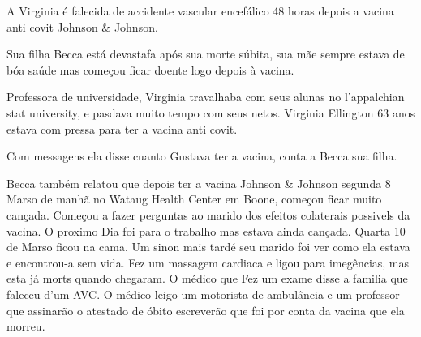 A Virginia é falecida de accidente vascular encefálico 48 horas depois a vacina
anti covit Johnson \& Johnson.

Sua filha Becca está devastafa após sua morte súbita, sua mãe sempre estava de
bóa saúde mas começou ficar doente logo depois à vacina.

Professora de universidade, Virginia travalhaba com seus alunas no l'appalchian
stat university, e pasdava muito tempo com seus netos. Virginia Ellington 63
anos estava com pressa para ter a vacina anti covit.

Com messagens ela disse cuanto Gustava ter a vacina, conta a Becca sua filha.

Becca também relatou que depois ter a vacina Johnson \& Johnson segunda 8 Marso
de manhã no Wataug Health Center em Boone, começou ficar muito cançada. Começou
a fazer perguntas ao marido dos efeitos colaterais possivels da vacina. O
proximo Dia foi para o trabalho mas estava ainda cançada. Quarta 10 de Marso
ficou na cama. Um sinon mais tardé seu marido foi ver como ela estava e
encontrou-a sem vida. Fez um massagem cardiaca e ligou para imegências, mas esta
já morts quando chegaram.  O médico que Fez um exame disse a familia que faleceu
d'um AVC. O médico leigo um motorista de ambulância e um professor que assinarão
o atestado de óbito escreverão que foi por conta da vacina que ela morreu.
